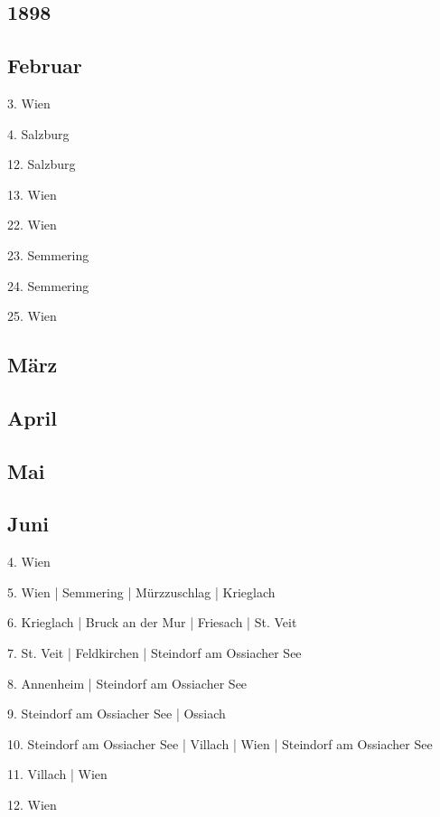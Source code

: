 \documentclass[twoside=false,titlepage=false,open=any, parskip=never, fontsize=10pt, headings=small, chapterprefix=false, appendixprefix=false, DIV=15]{scrbook}
\begin{document}
\begin{multicols}{3}
            \chapter*{1898}
            \section*{Februar}
            3. Wien\par
            4. Salzburg\par
            12. Salzburg\par
            13. Wien\par
            22. Wien\par
            23. Semmering\par
            24. Semmering\par
            25. Wien\par
            \section*{März}
            \section*{April}
            \section*{Mai}
            \section*{Juni}
            4. Wien\par
            5. Wien | Semmering | Mürzzuschlag | Krieglach\par
            6. Krieglach | Bruck an der Mur | Friesach | St. Veit\par
            7. St. Veit | Feldkirchen | Steindorf am Ossiacher See\par
            8. Annenheim | Steindorf am Ossiacher See\par
            9. Steindorf am Ossiacher See | Ossiach\par
            10. Steindorf am Ossiacher See | Villach | Wien | Steindorf am Ossiacher See\par
            11. Villach | Wien\par
            12. Wien\par

\end{multicols}
\end{document}
